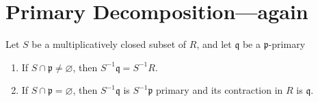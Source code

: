 \section{Primary Decomposition---again}
\begin{proposition}
  Let \( S \) be a multiplicatively closed subset of \( R \), and let  \( \mathfrak{q} \) be a \( \mathfrak{p} \)-primary
  \begin{enumerate}[label=\roman*)]
    \item If \( S \cap \mathfrak{p} \neq \varnothing\), then \( S^{-1}\mathfrak{q} = S^{-1}R\).
    \item If \( S \cap \mathfrak{p} = \varnothing \), then \( S^{-1}\mathfrak{q} \) is \( S^{-1}\mathfrak{p} \) primary and its contraction in \( R \) is  \( \mathfrak{q} \).
  \end{enumerate}
\end{proposition}
